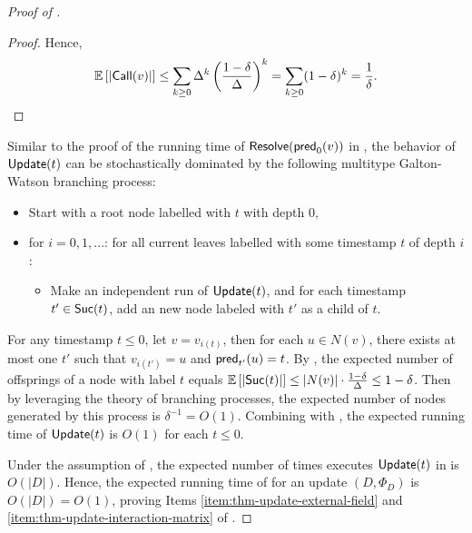 \begin{proof}[Proof of ]
\begin{proof}
Hence,
\begin{equation}
    \mathbb{E}\left[{|\textnormal{\textsf{Call}}(v)|}\right] \leq \sum\limits_{k\geq 0} \Delta^k \left(\frac{1-\delta}{\Delta}\right)^k = \sum\limits_{k\geq 0} (1-\delta)^k = \frac{1}{\delta}.
\end{equation}
\end{proof}

Similar to the proof of the running time of $\textnormal{\textsf{Resolve}}(\textnormal{\textsf{pred}}_0(v))$ in , the behavior of $\textnormal{\textsf{Update}}(t)$ can be stochastically dominated by the following multitype Galton-Watson branching process:
\begin{itemize}
    \item Start with a root node labelled with $t$ with depth $0$,
    \item for $i=0,1,\ldots$: for all current leaves labelled with some timestamp $t$ of depth $i$:
    \begin{itemize}
        \item Make an independent run of $\textnormal{\textsf{Update}}(t)$, and for each timestamp $t' \in \textnormal{\textsf{Suc}}(t)$, add an new node labeled with $t'$ as a child of $t$.
    \end{itemize}
\end{itemize}
For any timestamp $t\leq 0$, let $v=v_{i(t)}$, then for each $u\in N(v)$, there exists at most one $t'$ such that $v_{i(t')}=u$ and $\textnormal{\textsf{pred}}_{t'}(u) = t$. 
By , the expected number of offsprings of a node with label $t$ equals $\mathbb{E}\left[{|\textnormal{\textsf{Suc}}(t)|}\right] \leq |N(v)|\cdot \frac{1-\delta}{\Delta} \leq 1-\delta$. 
Then by leveraging the theory of branching processes, the expected number of nodes generated by this process is $\delta^{-1}=O(1)$. 
Combining with , the expected running time of $\textnormal{\textsf{Update}}(t)$ is $O(1)$ for each $t\leq 0$.

Under the assumption of , the expected number of times  executes $\textnormal{\textsf{Update}}(t)$ in  is $O(|D|)$. 
Hence, the expected running time of  for an update $(D,\Phi_D)$ is $O(|D|)=O(1)$, proving Items \ref{item:thm-update-external-field} and \ref{item:thm-update-interaction-matrix} of .
\end{proof}







